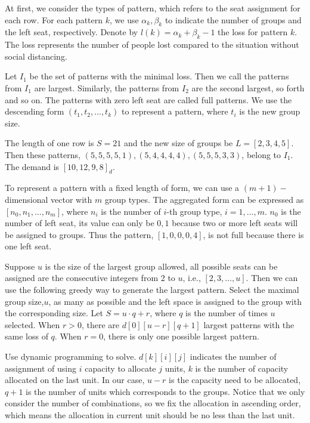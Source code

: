 At first, we consider the types of pattern, which refers to the seat assignment for each row. For each pattern $k$, we use $\alpha_k, \beta_k$ to indicate the number of groups and the left seat, respectively. Denote by $l(k) = \alpha_k + \beta_k -1$ the loss for pattern $k$. The loss represents the number of people lost compared to the situation without social distancing.

Let $I_1$ be the set of patterns with the minimal loss. Then we call the patterns from $I_1$ are largest. Similarly, the patterns from $I_2$ are the second largest, so forth and so on. The patterns with zero left seat are called full patterns. We use the descending form $(t_1, t_2, \ldots, t_k)$ to represent a pattern, where $t_i$ is the new group size. 

\begin{example}\label{ex_largest}
  The length of one row is $S = 21$ and the new size of groups be $L = [2, 3, 4, 5]$. Then these patterns, $(5, 5, 5, 5, 1),(5, 4, 4, 4, 4),(5, 5, 5, 3, 3)$, belong to $I_1$. The demand is $[10, 12, 9, 8]_d$.
\end{example}

To represent a pattern with a fixed length of form, we can use a $(m+1)-$dimensional vector with $m$ group types. The aggregated form can be expressed as $[n_0, n_1, \ldots, n_m]$, where $n_i$ is the number of $i$-th group type, $i=1,\ldots,m$. 
$n_0$ is the number of left seat, its value can only be $0, 1$ because two or more left seats will be assigned to groups. Thus the pattern, $[1, 0, 0, 0, 4]$, is not full because there is one left seat.

Suppose $u$ is the size of the largest group allowed, all possible seats can be assigned are the consecutive integers from 2 to $u$, i.e., $[2,3,\ldots,u]$.
Then we can use the following greedy way to generate the largest pattern. Select the maximal group size,$u$, as many as possible and the left space is assigned to the group with the corresponding size. Let $S = u\cdot q + r$, where $q$ is the number of times $u$ selected. When $r>0$, there are $d[0][u-r][q+1]$ largest patterns with the same loss of $q$. When $r =0$, there is only one possible largest pattern.

Use dynamic programming to solve. $d[k][i][j]$ indicates the number of assignment of using $i$ capacity to allocate $j$ units, $k$ is the number of capacity allocated on the last unit. In our case, $u-r$ is the capacity need to be allocated, $q+1$ is the number of units which corresponds to the groups. Notice that we only consider the number of combinations, so we fix the allocation in ascending order, which means the allocation in current unit should be no less than the last unit.  

